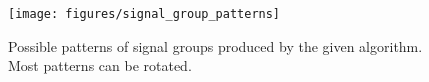 \begin{figure}[ht]
  \centering
  \texttt{[image: figures/signal\_group\_patterns]}
  \caption{Possible patterns of signal groups produced by the given algorithm. Most patterns can be rotated.}
  \label{signal_group_pattern}
\end{figure}